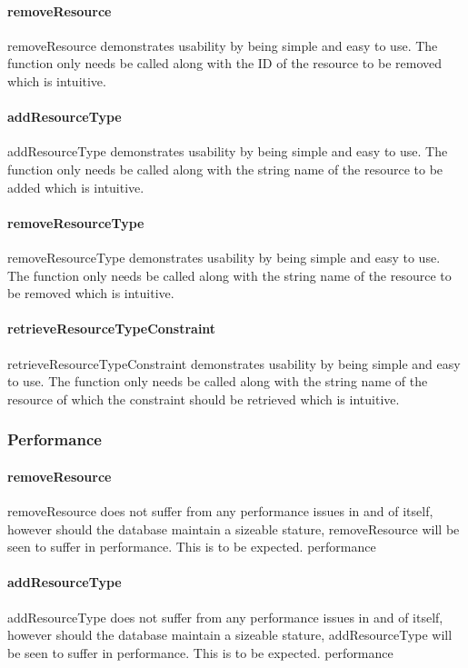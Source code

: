\documentclass[a4paper]{article}
\begin{document}
\paragraph{removeResource}
removeResource demonstrates usability by being simple and easy to use. The function only needs be called along with the ID of the resource to be removed which is intuitive.

\paragraph{addResourceType}
addResourceType demonstrates usability by being simple and easy to use. The function only needs be called along with the string name of the resource to be added which is intuitive.

\paragraph{removeResourceType}
removeResourceType demonstrates usability by being simple and easy to use. The function only needs be called along with the string name of the resource to be removed which is intuitive.

\paragraph{retrieveResourceTypeConstraint}
retrieveResourceTypeConstraint demonstrates usability by being simple and easy to use. The function only needs be called along with the string name of the resource of which the constraint should be retrieved which is intuitive.

\subsubsection {Performance}

\paragraph{removeResource}
removeResource does not suffer from any performance issues in and of itself, however should the database maintain a sizeable stature, removeResource will be seen to suffer in performance. This is to be expected.
performance

\paragraph{addResourceType}
addResourceType does not suffer from any performance issues in and of itself, however should the database maintain a sizeable stature, addResourceType will be seen to suffer in performance. This is to be expected.
performance
\end{document}
